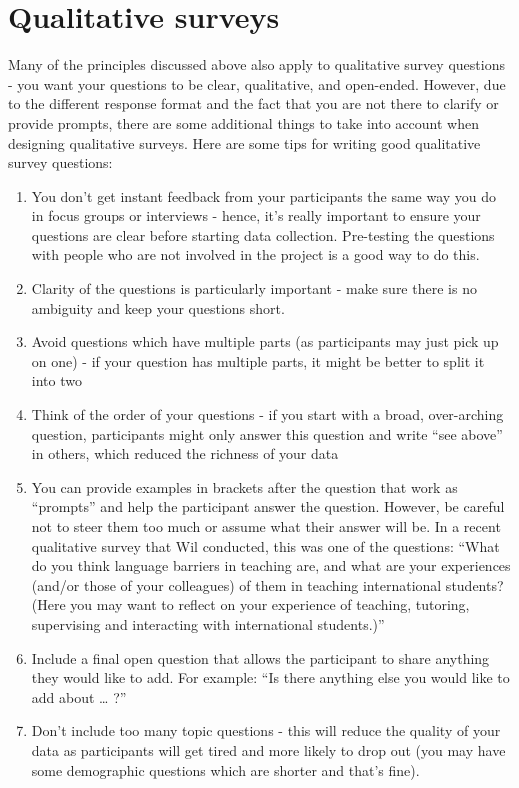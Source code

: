 \documentclass[
  english,
  letterpaper,
  DIV=11,
  numbers=noendperiod]{scrreprt}
\begin{document}
\section{Qualitative surveys}\label{qualitative-surveys}

Many of the principles discussed above also apply to qualitative survey
questions - you want your questions to be clear, qualitative, and
open-ended. However, due to the different response format and the fact
that you are not there to clarify or provide prompts, there are some
additional things to take into account when designing qualitative
surveys. Here are some tips for writing good qualitative survey
questions:

\begin{enumerate}
\def\labelenumi{\arabic{enumi}.}
\item
  You don't get instant feedback from your participants the same way you
  do in focus groups or interviews - hence, it's really important to
  ensure your questions are clear before starting data collection.
  Pre-testing the questions with people who are not involved in the
  project is a good way to do this.
\item
  Clarity of the questions is particularly important - make sure there
  is no ambiguity and keep your questions short.
\item
  Avoid questions which have multiple parts (as participants may just
  pick up on one) - if your question has multiple parts, it might be
  better to split it into two
\item
  Think of the order of your questions - if you start with a broad,
  over-arching question, participants might only answer this question
  and write ``see above'' in others, which reduced the richness of your
  data
\item
  You can provide examples in brackets after the question that work as
  ``prompts'' and help the participant answer the question. However, be
  careful not to steer them too much or assume what their answer will
  be. In a recent qualitative survey that Wil conducted, this was one of
  the questions: ``What do you think language barriers in teaching are,
  and what are your experiences (and/or those of your colleagues) of
  them in teaching international students? (Here you may want to reflect
  on your experience of teaching, tutoring, supervising and interacting
  with international students.)''
\item
  Include a final open question that allows the participant to share
  anything they would like to add. For example: ``Is there anything else
  you would like to add about \ldots{} ?''
\item
  Don't include too many topic questions - this will reduce the quality
  of your data as participants will get tired and more likely to drop
  out (you may have some demographic questions which are shorter and
  that's fine).
\end{enumerate}
\end{document}
